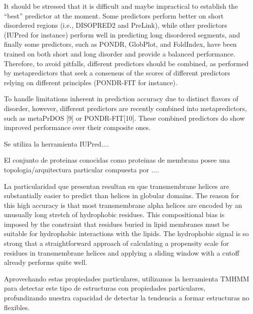 It should be stressed that it is difficult and maybe impractical to establish the “best” predictor at the moment. Some predictors perform
better on short disordered regions (i.e., DISOPRED2 and PreLink), while other predictors (IUPred for instance) perform well in predicting long disordered segments, and finally some
predictors, such as PONDR, GlobPlot, and FoldIndex, have been trained on both short and long disorder and provide a balanced performance. 
Therefore, to avoid pitfalls, different predictors should be combined, as performed by metapredictors that seek a consensus of the scores of different predictors relying on different
principles (PONDR-FIT for instance).

To handle limitations inherent in prediction accuracy due to distinct flavors of disorder, however, different predictors are recently combined into metapredictors, such as metaPrDOS [9] or PONDR-FIT[10]. 
These combined predictors do show improved performance over their composite ones.

Se utiliza la herramienta IUPred....




El conjunto de proteinas conocidas como proteinas de membrana posee una topologia/arquitectura particular compuesta por ....

La particularidad que presentan resultan en que transmembrane helices are substantially easier to predict than helices in globular domains.
The reason for this high accuracy is that most transmembrane alpha helices are encoded by an unusually long stretch of
hydrophobic residues. This compositional bias is imposed by the constraint that residues buried in lipid membranes
must be suitable for hydrophobic interactions with the lipids.
The hydrophobic signal is so strong that a straightforward approach of calculating a propensity scale for residues in
transmembrane helices and applying a sliding window with a cutoff already performs quite well.

Aprovechando estas propiedades particulares, utilizamos la herramienta TMHMM para detectar este tipo de estructuras con propiedades particulares, profundizando nuestra capacidad de detectar la tendencia a formar estructuras no flexibles.




